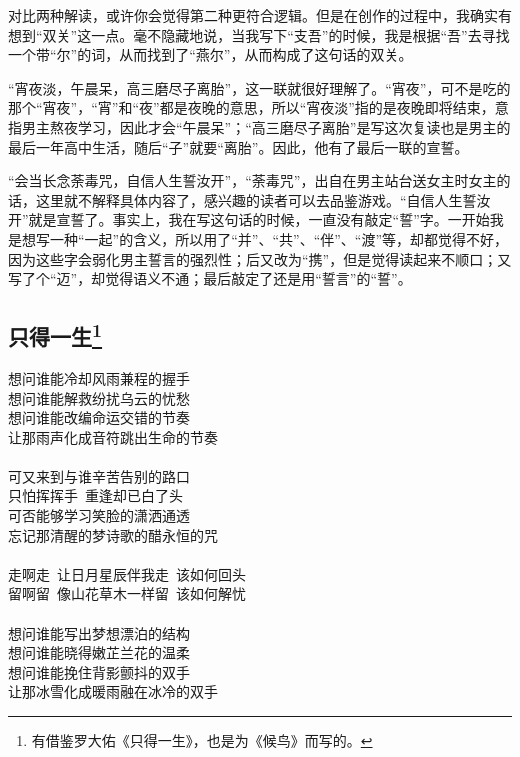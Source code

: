 \documentclass[a5paper]{ctexart}
\begin{document}
\begin{small}
		对比两种解读，或许你会觉得第二种更符合逻辑。但是在创作的过程中，我确实有想到“双关”这一点。毫不隐藏地说，当我写下“支吾”的时候，我是根据“吾”去寻找一个带“尔”的词，从而找到了“燕尔”，从而构成了这句话的双关。
		
		“宵夜淡，午晨呆，高三磨尽子离胎”，这一联就很好理解了。“宵夜”，可不是吃的那个“宵夜”，“宵”和“夜”都是夜晚的意思，所以“宵夜淡”指的是夜晚即将结束，意指男主熬夜学习，因此才会“午晨呆”；“高三磨尽子离胎”是写这次复读也是男主的最后一年高中生活，随后“子”就要“离胎”。因此，他有了最后一联的宣誓。
		
		“会当长念荼毒咒，自信人生誓汝开”，“荼毒咒”，出自在男主站台送女主时女主的话，这里就不解释具体内容了，感兴趣的读者可以去品鉴游戏。“自信人生誓汝开”就是宣誓了。事实上，我在写这句话的时候，一直没有敲定“誓”字。一开始我是想写一种“一起”的含义，所以用了“并”、“共”、“伴”、“渡”等，却都觉得不好，因为这些字会弱化男主誓言的强烈性；后又改为“携”，但是觉得读起来不顺口；又写了个“迈”，却觉得语义不通；最后敲定了还是用“誓言”的“誓”。
		
	\end{small}
	
	\subsection[只得一生]{只得一生\footnote{有借鉴罗大佑《只得一生》，也是为《候鸟》而写的。}}
	\begin{center}
		想问谁能冷却风雨兼程的握手\\
		想问谁能解救纷扰乌云的忧愁\\
		想问谁能改编命运交错的节奏\\
		让那雨声化成音符跳出生命的节奏\\ \hspace*{\fill} \\
		
		可又来到与谁辛苦告别的路口\\
		只怕挥挥手\  重逢却已白了头\\
		可否能够学习笑脸的潇洒通透\\
		忘记那清醒的梦诗歌的醋永恒的咒\\ \hspace*{\fill} \\
		
		走啊走\  让日月星辰伴我走\  该如何回头\\
		留啊留\  像山花草木一样留\  该如何解忧\\ \hspace*{\fill} \\
		
		想问谁能写出梦想漂泊的结构\\
		想问谁能晓得嫩芷兰花的温柔\\
		想问谁能挽住背影颤抖的双手\\
		让那冰雪化成暖雨融在冰冷的双手
	\end{center}
	
\end{document}
